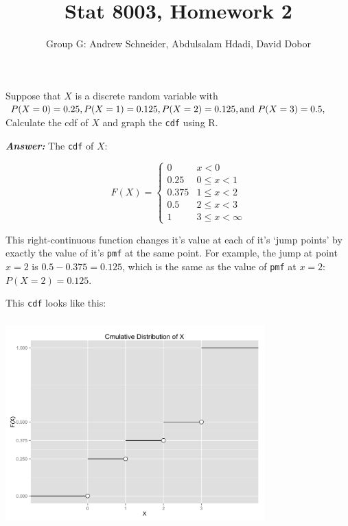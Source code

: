 \documentclass[12pt]{article}
\newenvironment{question}[2][Question]{\begin{trivlist}
\item[\hskip \labelsep {\bfseries #1}\hskip \labelsep {\bfseries #2.}]}{\end{trivlist}}
\begin{document}
 

 
\title{Stat 8003, Homework 2}%
\author{Group G: Andrew Schneider,  Abdulsalam Hdadi, David Dobor
\\ %
} %
 
\maketitle
 
 
\begin{question}{2.1} %
Suppose that $X$ is a discrete random variable with $P (X= 0) = 0.25, \\P (X = 1) = 0.125, P (X = 2) = 0.125, \text{and } P(X = 3) = 0.5, $ Calculate the cdf of $X$ and graph the \texttt{cdf} using $\mathrm{R}$.
\end{question}
 
 \textbf{\emph{Answer:} } The \texttt{cdf} of $X$: 
 
 \[ 
 F(X) = 
  \begin{cases} 
       0   & x <  0 \\
      0.25 & 0\leq x < 1 \\
      0.375 & 1\leq x < 2\\
      0.5 & 2\leq x < 3\\
      1 & 3\leq x < \infty 
   \end{cases}
\]
 
 This right-continuous function changes it's value at each of it's `jump points' by exactly the value of it's \texttt{pmf} at the same point. For example, the jump at point $ x = 2 $ is $0.5 - 0.375 = 0.125$, which is the same as the value of \texttt{pmf} at  $ x = 2$: $P (X = 2) = 0.125.$ 
 
 This \texttt{cdf} looks like this:
 
 \begin{center}
\includegraphics[width=10cm, height=8cm]{cdf_plot}
 
\end{center}
\end{document}
